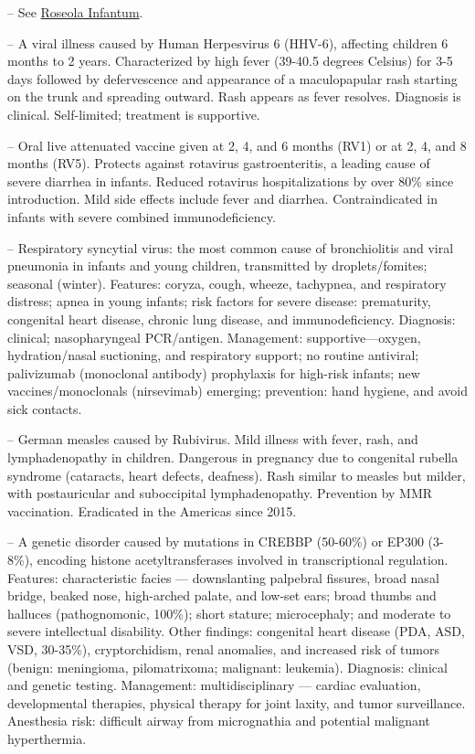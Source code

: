 -- See \hyperlink{Roseola Infantum}{Roseola Infantum}.

-- A viral illness caused by Human Herpesvirus 6 (HHV-6), affecting children 6 months to 2 years. Characterized by high fever (39-40.5 degrees Celsius) for 3-5 days followed by defervescence and appearance of a maculopapular rash starting on the trunk and spreading outward. Rash appears as fever resolves. Diagnosis is clinical. Self-limited; treatment is supportive.

-- Oral live attenuated vaccine given at 2, 4, and 6 months (RV1) or at 2, 4, and 8 months (RV5). Protects against rotavirus gastroenteritis, a leading cause of severe diarrhea in infants. Reduced rotavirus hospitalizations by over 80\% since introduction. Mild side effects include fever and diarrhea. Contraindicated in infants with severe combined immunodeficiency.

-- Respiratory syncytial virus: the most common cause of bronchiolitis and viral pneumonia in infants and young children, transmitted by droplets/fomites; seasonal (winter). Features: coryza, cough, wheeze, tachypnea, and respiratory distress; apnea in young infants; risk factors for severe disease: prematurity, congenital heart disease, chronic lung disease, and immunodeficiency. Diagnosis: clinical; nasopharyngeal PCR/antigen. Management: supportive—oxygen, hydration/nasal suctioning, and respiratory support; no routine antiviral; palivizumab (monoclonal antibody) prophylaxis for high-risk infants; new vaccines/monoclonals (nirsevimab) emerging; prevention: hand hygiene, and avoid sick contacts.

-- German measles caused by Rubivirus. Mild illness with fever, rash, and lymphadenopathy in children. Dangerous in pregnancy due to congenital rubella syndrome (cataracts, heart defects, deafness). Rash similar to measles but milder, with postauricular and suboccipital lymphadenopathy. Prevention by MMR vaccination. Eradicated in the Americas since 2015.

-- A genetic disorder caused by mutations in CREBBP (50-60\%) or EP300 (3-8\%), encoding histone acetyltransferases involved in transcriptional regulation. Features: characteristic facies — downslanting palpebral fissures, broad nasal bridge, beaked nose, high-arched palate, and low-set ears; broad thumbs and halluces (pathognomonic, 100\%); short stature; microcephaly; and moderate to severe intellectual disability. Other findings: congenital heart disease (PDA, ASD, VSD, 30-35\%), cryptorchidism, renal anomalies, and increased risk of tumors (benign: meningioma, pilomatrixoma; malignant: leukemia). Diagnosis: clinical and genetic testing. Management: multidisciplinary — cardiac evaluation, developmental therapies, physical therapy for joint laxity, and tumor surveillance. Anesthesia risk: difficult airway from micrognathia and potential malignant hyperthermia.

